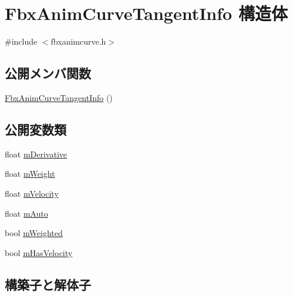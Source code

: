 \hypertarget{struct_fbx_anim_curve_tangent_info}{}\section{Fbx\+Anim\+Curve\+Tangent\+Info 構造体}
\label{struct_fbx_anim_curve_tangent_info}


{\ttfamily \#include $<$fbxanimcurve.\+h$>$}

\subsection*{公開メンバ関数}
\begin{DoxyCompactItemize}
\item 
\hyperlink{struct_fbx_anim_curve_tangent_info_a2303015d59098b2cb51e0619da55e463}{Fbx\+Anim\+Curve\+Tangent\+Info} ()
\end{DoxyCompactItemize}
\subsection*{公開変数類}
\begin{DoxyCompactItemize}
\item 
float \hyperlink{struct_fbx_anim_curve_tangent_info_abd0ff621b7ca5bb0edf54f62dadfed25}{m\+Derivative}
\item 
float \hyperlink{struct_fbx_anim_curve_tangent_info_a8cf904d34d913370ea3344b1857532a8}{m\+Weight}
\item 
float \hyperlink{struct_fbx_anim_curve_tangent_info_a12c39deedc5bde4e64a41a606a9bac89}{m\+Velocity}
\item 
float \hyperlink{struct_fbx_anim_curve_tangent_info_a24d7f2c4210a679ddc3e5e846282c47c}{m\+Auto}
\item 
bool \hyperlink{struct_fbx_anim_curve_tangent_info_ae608f70fa456fbe2ce25ba65580c2db0}{m\+Weighted}
\item 
bool \hyperlink{struct_fbx_anim_curve_tangent_info_ad61ef6060ebd2468e06dfdbd32295a29}{m\+Has\+Velocity}
\end{DoxyCompactItemize}


\subsection{構築子と解体子}
\mbox{\label{struct_fbx_anim_curve_tangent_info_a2303015d59098b2cb51e0619da55e463}} 

